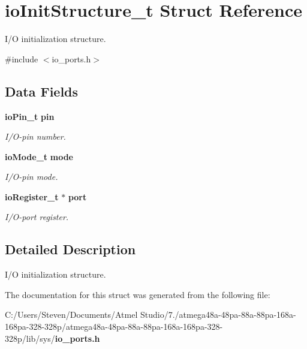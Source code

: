 \section{io\+Init\+Structure\+\_\+t Struct Reference}
\label{structio_init_structure__t}


I/O initialization structure.  




{\ttfamily \#include $<$io\+\_\+ports.\+h$>$}

\subsection*{Data Fields}
\begin{DoxyCompactItemize}
\item 
{\bf io\+Pin\+\_\+t} {\bf pin}\label{structio_init_structure__t_ae9f95cd1aa2228aa4b048cded824dbe8}

\begin{DoxyCompactList}\small\item\em I/\+O-\/pin number. \end{DoxyCompactList}\item 
{\bf io\+Mode\+\_\+t} {\bf mode}\label{structio_init_structure__t_acd43c77888b42b6256e0e7874f97b460}

\begin{DoxyCompactList}\small\item\em I/\+O-\/pin mode. \end{DoxyCompactList}\item 
{\bf io\+Register\+\_\+t} $\ast$ {\bf port}\label{structio_init_structure__t_a766af468e1f902a4929ac636cd2bcc04}

\begin{DoxyCompactList}\small\item\em I/\+O-\/port register. \end{DoxyCompactList}\end{DoxyCompactItemize}


\subsection{Detailed Description}
I/O initialization structure. 

The documentation for this struct was generated from the following file\+:\begin{DoxyCompactItemize}
\item 
C\+:/\+Users/\+Steven/\+Documents/\+Atmel Studio/7./atmega48a-\/48pa-\/88a-\/88pa-\/168a-\/168pa-\/328-\/328p/atmega48a-\/48pa-\/88a-\/88pa-\/168a-\/168pa-\/328-\/328p/lib/sys/{\bf io\+\_\+ports.\+h}\end{DoxyCompactItemize}
